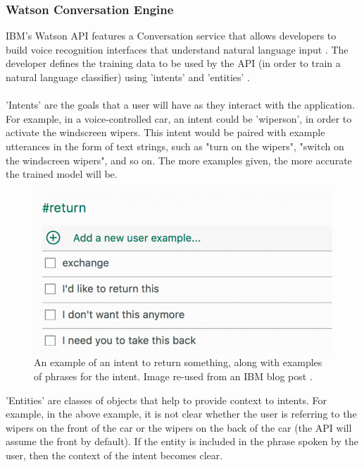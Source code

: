 \documentclass[11pt]{article}
\begin{document}
\subsubsection{Watson Conversation Engine}

IBM's Watson API features a Conversation service that allows developers to build voice recognition interfaces that understand natural language input \cite{RefWorks:27}. The developer defines the training data to be used by the API (in order to train a natural language classifier) using 'intents' and 'entities' \cite{RefWorks:31}.
\\
\\
'Intents' are the goals that a user will have as they interact with the application. For example, in a voice-controlled car, an intent could be 'wipers\textunderscore on', in order to activate the windscreen wipers. This intent would be paired with example utterances in the form of text strings, such as "turn on the wipers", "switch on the windscreen wipers", and so on. The more examples given, the more accurate the trained model will be.
\begin{center}
\begin{figure}[H]
  \includegraphics[width=\textwidth]{intent-return.png}
  \caption{An example of an intent to return something, along with examples of phrases for the intent. Image re-used from an IBM blog post \cite{RefWorks:34}.}
\end{figure}
\end{center}
'Entities' are classes of objects that help to provide context to intents. For example, in the above example, it is not clear whether the user is referring to the wipers on the front of the car or the wipers on the back of the car (the API will assume the front by default). If the entity is included in the phrase spoken by the user, then the context of the intent becomes clear.
\end{document}
